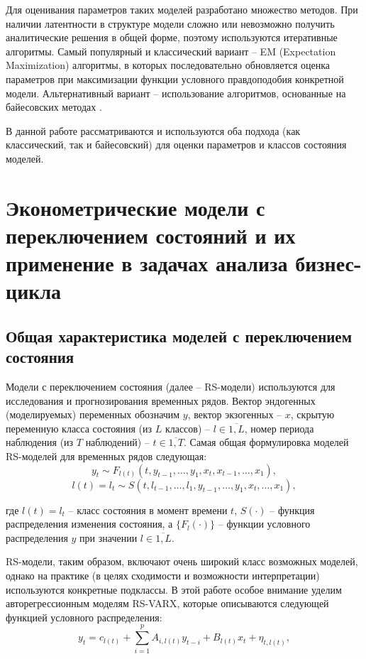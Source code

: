 \documentclass[a4paper,14pt]{extreport}
\begin{document}
Для оценивания параметров таких моделей разработано множество методов. При наличии латентности в структуре модели сложно или невозможно получить аналитические решения в общей форме, поэтому используются итеративные алгоритмы. Самый популярный и классический вариант \cite{malNovopMSVARX, malNovopHiddenMarkov, rs_hamilton_palgrave} -- EM (Expectation Maximization) алгоритмы, в которых последовательно обновляется оценка параметров при максимизации функции условного правдоподобия конкретной модели. Альтернативный вариант -- использование алгоритмов, основанные на байесовских методах \cite{rs_persio2014, rs_hamilton_palgrave}. 

В данной работе рассматриваются и используются оба подхода (как классический, так и байесовский) для оценки параметров и классов состояния моделей.

\chapter{Эконометрические модели с переключением состояний и их применение в задачах анализа бизнес-цикла}


\section{Общая характеристика моделей с переключением состояния}
Модели с переключением состояния (далее – RS-модели) используются для исследования и прогнозирования временных рядов. Вектор эндогенных (моделируемых) переменных обозначим $y$, вектор экзогенных -- $x$, скрытую переменную класса состояния (из $L$ классов) -- $l \in \overline{1, L}$, номер периода наблюдения (из $T$ наблюдений) -- $t \in \overline{1,T}$.
Самая общая формулировка моделей RS-моделей для временных рядов следующая:
\begin{equation}
	y_t \sim F_{l(t)}(t, y_{t-1}, \dots, y_1, x_t, x_{t-1}, \dots, x_1) ,
\end{equation}
\begin{equation}
	l(t) = l_t \sim S(t, l_{t-1}, \dots, l_1, y_{t-1}, \dots, y_1, x_t, \dots, x_1) ,
\end{equation}

\noindent
где $l(t) = l_t$ -- класс состояния в момент времени $t$, $S(\cdot)$ -- функция распределения изменения состояния, а $\{F_l(\cdot)\}$ -- функции условного распределения $y$ при значении $l \in \overline{1,L}$. 

RS-модели, таким образом, включают очень широкий класс возможных моделей, однако на практике (в целях сходимости и возможности интерпретации) используются конкретные подклассы. В этой работе особое внимание уделим авторегрессионным моделям RS-VARX, которые описываются следующей функцией условного распределения:
\begin{equation}
	y_{t}=c_{l(t)} + \sum_{i=1}^{p} A_{i,l(t)} y_{t-i} + B_{l(t)} x_{t} + \eta_{t, l(t)} ,
\end{equation}
\end{document}
